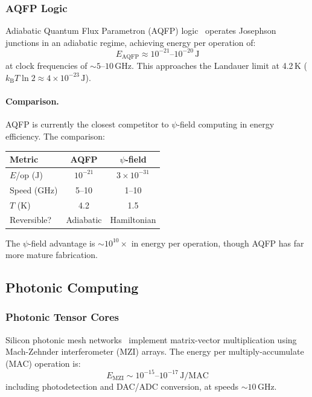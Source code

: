 \documentclass[11pt,twocolumn]{article}
\theoremstyle{definition}
\theoremstyle{remark}
\newcommand{\kB}{k_{\mathrm{B}}}
\begin{document}
\subsubsection{AQFP Logic}

Adiabatic Quantum Flux Parametron (AQFP) logic~\cite{Takeuchi2013,
Takeuchi2017} operates Josephson junctions in an adiabatic regime,
achieving energy per operation of:
\begin{equation}
E_{\mathrm{AQFP}} \approx 10^{-21}\text{--}10^{-20}\,\mathrm{J}
\end{equation}
at clock frequencies of $\sim 5$--$10\,\mathrm{GHz}$. This approaches
the Landauer limit at 4.2\,K ($\kB T\ln 2 \approx 4\times
10^{-23}\,\mathrm{J}$).

\paragraph{Comparison.} AQFP is currently the closest competitor to
$\psi$-field computing in energy efficiency. The comparison:
\begin{center}
\begin{tabular}{lcc}
\toprule
Metric & AQFP & $\psi$-field \\
\midrule
$E$/op (J) & $10^{-21}$ & $3\times 10^{-31}$ \\
Speed (GHz) & 5--10 & 1--10 \\
$T$ (K) & 4.2 & 1.5 \\
Reversible? & Adiabatic & Hamiltonian \\
\bottomrule
\end{tabular}
\end{center}

The $\psi$-field advantage is $\sim 10^{10}\times$ in energy per
operation, though AQFP has far more mature fabrication.

\subsection{Photonic Computing}

\subsubsection{Photonic Tensor Cores}

Silicon photonic mesh networks~\cite{Shen2017,Harris2018} implement
matrix-vector multiplication using Mach-Zehnder interferometer (MZI)
arrays. The energy per multiply-accumulate (MAC) operation is:
\begin{equation}
E_{\mathrm{MZI}} \sim 10^{-15}\text{--}10^{-17}\,\mathrm{J/MAC}
\end{equation}
including photodetection and DAC/ADC conversion, at speeds $\sim
10\,\mathrm{GHz}$.
\end{document}
